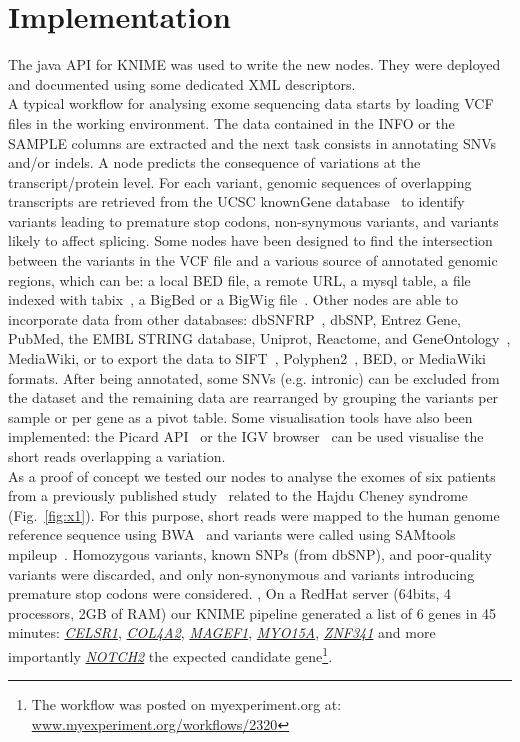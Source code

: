 \documentclass{bioinfo}
\begin{document}
\section{Implementation}

The java API for KNIME was used to write the new nodes. They were deployed and documented using some dedicated XML descriptors.
\\
A typical workflow for analysing exome sequencing data starts by loading VCF files in the working environment. The data contained in the INFO or the SAMPLE columns are extracted and the next task consists in annotating SNVs and/or indels. A node predicts the consequence of variations at the transcript/protein level. For each variant, genomic sequences of overlapping transcripts are retrieved from the UCSC knownGene database~\citep{pmid16500937} to identify variants leading to premature stop codons, non-synymous variants, and variants likely to affect splicing.  Some nodes have been designed to find the intersection between the variants in the VCF file and a various source of annotated genomic regions, which can be: a local BED file, a remote URL, a mysql table, a file indexed with tabix~\citep{pmid21208982}, a BigBed or a BigWig file~\citep{pmid20639541}. Other nodes are able to incorporate data from other databases: dbSNFRP~\citep{pmid21520341}, dbSNP, Entrez Gene, PubMed, the EMBL STRING database, Uniprot, Reactome, and GeneOntology~\citep{pmid17098935}, MediaWiki, or to export the data to SIFT~\citep{pmid11337480}, Polyphen2~\citep{pmid20354512}, BED, or MediaWiki formats. After being annotated, some SNVs (e.g. intronic) can be excluded from the dataset and the remaining data are rearranged by grouping the variants per sample or per gene as a pivot table. Some visualisation tools have also been implemented: the Picard API~\citep{pmid19505943} or the IGV browser~\citep{pmid21221095} can be used visualise the short reads overlapping a variation.
\\
As a proof of concept we tested our nodes to analyse the exomes of six patients from a previously published study~\citep{pmid21378989} related to the Hajdu Cheney syndrome (Fig.~\ref{fig:x1}). For this purpose, short reads were mapped to the human genome reference sequence using BWA~\citep{pmid20080505} and variants were called using SAMtools mpileup~\citep{pmid19505943}. Homozygous variants, known SNPs (from dbSNP), and poor-quality variants were discarded, and only non-synonymous and variants introducing premature stop codons were considered. , On a RedHat server (64bits, 4 processors, 2GB of RAM) our KNIME pipeline generated a list of 6 genes in 45 minutes: \href{http://www.ncbi.nlm.nih.gov/gene/9620}{\textit{CELSR1}},  \href{http://www.ncbi.nlm.nih.gov/gene/1284}{\textit{COL4A2}}, \href{http://www.ncbi.nlm.nih.gov/gene/64110}{\textit{MAGEF1}}, \href{http://www.ncbi.nlm.nih.gov/gene/51168}{\textit{MYO15A}}, \href{http://www.ncbi.nlm.nih.gov/gene/84905}{\textit{ZNF341}} and more importantly \href{http://www.ncbi.nlm.nih.gov/gene/4853}{\textit{NOTCH2}} the expected candidate gene\footnote{The workflow was posted on myexperiment.org at: \href{http://www.myexperiment.org/workflows/2320.html}{www.myexperiment.org/workflows/2320}}.
\end{document}
